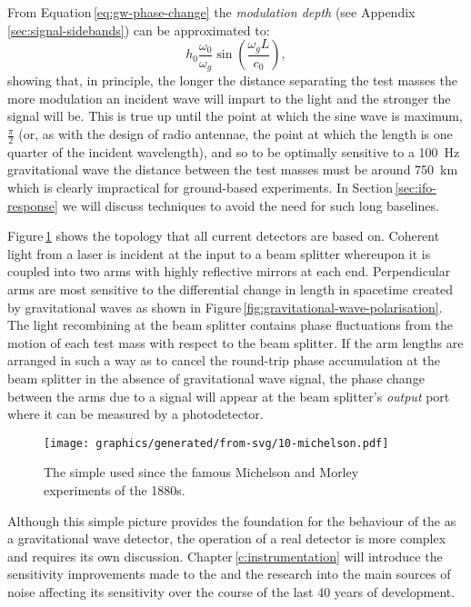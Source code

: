 From Equation\,\ref{eq:gw-phase-change} the \emph{modulation depth} (see Appendix\,\ref{sec:signal-sidebands}) can be approximated to:
\begin{equation}
  \label{eq:gw-mod-depth}
  h_0 \frac{\omega_0}{\omega_g} \sin \left( \frac{\omega_g L}{c_0} \right),
\end{equation}
showing that, in principle, the longer the distance separating the test masses the more modulation an incident wave will impart to the light and the stronger the signal will be. This is true up until the point at which the sine wave is maximum, $\frac{\pi}{2}$ (or, as with the design of radio antennae, the point at which the length is one quarter of the incident wavelength), and so to be optimally sensitive to a \SI{100}{\hertz} gravitational wave the distance between the test masses must be around \SI{750}{\kilo\meter} which is clearly impractical for ground-based experiments. In Section\,\ref{sec:ifo-response} we will discuss techniques to avoid the need for such long baselines.

Figure\,\ref{fig:mi} shows the \MI{} topology that all current detectors are based on. Coherent light from a laser is incident at the input to a beam splitter whereupon it is coupled into two arms with highly reflective mirrors at each end. Perpendicular arms are most sensitive to the differential change in length in spacetime created by gravitational waves as shown in Figure\,\ref{fig:gravitational-wave-polarisation}. The light recombining at the beam splitter contains phase fluctuations from the motion of each test mass with respect to the beam splitter. If the arm lengths are arranged in such a way as to cancel the round-trip phase accumulation at the beam splitter in the absence of gravitational wave signal, the phase change between the arms due to a signal will appear at the beam splitter's \emph{output} port where it can be measured by a photodetector.

\begin{figure}
  \centering
  \texttt{[image: graphics/generated/from-svg/10-michelson.pdf]}
  \caption[Simple \MI{}]{\label{fig:mi}The simple \MI{} used since the famous Michelson and Morley experiments of the 1880s.}
\end{figure}

Although this simple picture provides the foundation for the behaviour of the \MI{} as a gravitational wave detector, the operation of a real detector is more complex and requires its own discussion. Chapter\,\ref{c:instrumentation} will introduce the sensitivity improvements made to the \MI{} and the research into the main sources of noise affecting its sensitivity over the course of the last \num{40} years of development.

